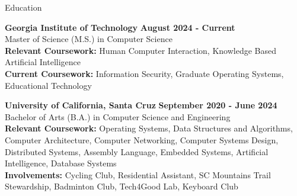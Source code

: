 \documentclass{resume}
\begin{document}
\begin{rSection}{\large Education}

{\bf Georgia Institute of Technology} \hfill {\bf{August 2024 - Current}}
\\ Master of Science (M.S.) in Computer Science\hfill %
\\ \textbf{Relevant Coursework:} Human Computer Interaction, Knowledge Based Artificial Intelligence
\\ \textbf{Current Coursework:} Information Security, Graduate Operating Systems, Educational Technology

{\bf University of California, Santa Cruz} \hfill {\bf{September 2020 - June 2024}}
\\ Bachelor of Arts (B.A.) in Computer Science and Engineering\hfill %
\\ \textbf{Relevant Coursework:} Operating Systems, Data Structures and Algorithms, Computer Architecture, Computer Networking, Computer Systems Design, Distributed Systems, Assembly Language, Embedded Systems, Artificial Intelligence, Database Systems
\\ \textbf{Involvements:} Cycling Club, Residential Assistant, SC Mountains Trail Stewardship, Badminton Club, Tech4Good Lab, Keyboard Club 

\end{rSection}
\end{document}

